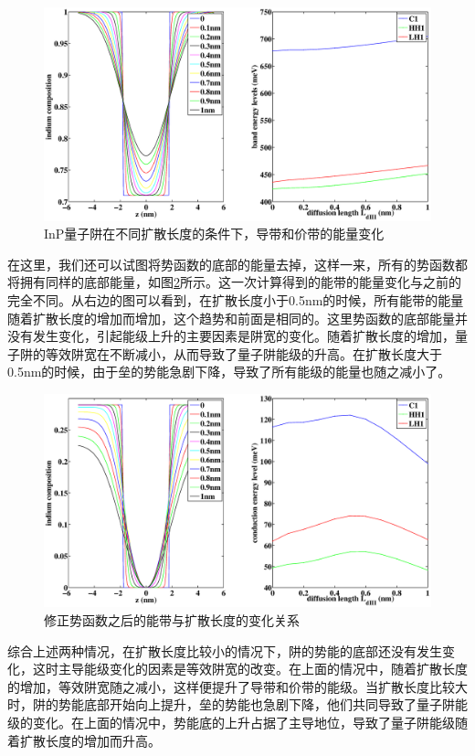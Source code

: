 \documentclass[oneside]{ZJUthesis}
\begin{document}
\begin{figure}[!t]
    \centering
    \includegraphics[width=1.0\textwidth]{./Pictures/Ld_1.eps}
    \caption{InP量子阱在不同扩散长度的条件下，导带和价带的能量变化}
    \label{fig_Ld_1}
\end{figure}

在这里，我们还可以试图将势函数的底部的能量去掉，这样一来，所有的势函数都将拥有同样的底部能量，如图\ref{fig_Ld_2}所示。这一次计算得到的能带的能量变化与之前的完全不同。从右边的图可以看到，在扩散长度小于0.5nm的时候，所有能带的能量随着扩散长度的增加而增加，这个趋势和前面是相同的。这里势函数的底部能量并没有发生变化，引起能级上升的主要因素是阱宽的变化。随着扩散长度的增加，量子阱的等效阱宽在不断减小，从而导致了量子阱能级的升高。在扩散长度大于0.5nm的时候，由于垒的势能急剧下降，导致了所有能级的能量也随之减小了。

\begin{figure}[!t]
    \centering
    \includegraphics[width=1.0\textwidth]{./Pictures/Ld_2.eps}
    \caption{修正势函数之后的能带与扩散长度的变化关系}
    \label{fig_Ld_2}
\end{figure}

综合上述两种情况，在扩散长度比较小的情况下，阱的势能的底部还没有发生变化，这时主导能级变化的因素是等效阱宽的改变。在上面的情况中，随着扩散长度的增加，等效阱宽随之减小，这样便提升了导带和价带的能级。当扩散长度比较大时，阱的势能底部开始向上提升，垒的势能也急剧下降，他们共同导致了量子阱能级的变化。在上面的情况中，势能底的上升占据了主导地位，导致了量子阱能级随着扩散长度的增加而升高。
\end{document}
